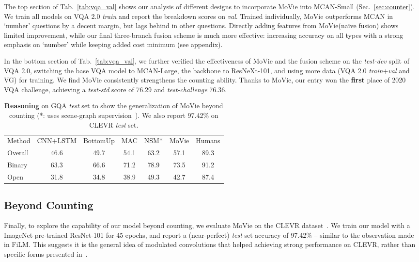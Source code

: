 \documentclass{article} \usepackage[dvipsnames,table]{xcolor}
\newcommand{\ours}[0]{MoVie\xspace}
\newcommand{\tablestyle}[2]{\setlength{\tabcolsep}{#1}\renewcommand{\arraystretch}{#2}\centering\footnotesize}
\begin{document}
The top section of Tab.~\ref{tab:vqa_val} shows our analysis of different designs to incorporate \ours into MCAN-Small (Sec.~\ref{sec:counter}). We train all models on VQA 2.0 {\em train} and report the breakdown scores on {\em val}. Trained individually, \ours outperforms MCAN in `number' questions by a decent margin, but lags behind in other questions. Directly adding features from \ours (na\"{i}ve fusion) shows limited improvement, while our final three-branch fusion scheme is much more effective: increasing accuracy on all types with a strong emphasis on `number' while keeping added cost minimum (see appendix).

In the bottom section of Tab.~\ref{tab:vqa_val}, we further verified the effectiveness of \ours and the fusion scheme on the {\em test-dev} split of VQA 2.0, switching the base VQA model to MCAN-Large, the backbone to ResNeXt-101, and using more data (VQA 2.0 {\em train}+{\em val} and VG) for training. We find \ours consistently strengthens the counting ability. Thanks to \ours, our entry won the \textbf{first} place of 2020 VQA challenge, achieving a \emph{test-std} score of 76.29 and \emph{test-challenge} 76.36. 

\begin{table}[t]
\tablestyle{3.5pt}{1.1}
\begin{tabular}{l|cccc|c|c}
Method & CNN+LSTM & BottomUp \citeyearpar{anderson2018bottom} & MAC \citeyearpar{hudson2018compositional} & NSM* \citeyearpar{hudson2019learning} & \ours & Humans \\
\shline
Overall  & 46.6 & 49.7 & 54.1 & 63.2 & 57.1 & 89.3 \\
Binary  & 63.3 & 66.6 & 71.2 & 78.9 & 73.5 & 91.2 \\
Open  & 31.8 & 34.8 & 38.9 & 49.3 & 42.7 & 87.4 \\
\end{tabular}
\smallskip
\caption{{\bf Reasoning} on GQA {\em test} set to show the generalization of \ours beyond counting (*: uses scene-graph supervision~\cite{krishna2017visual}). We also report 97.42\% on CLEVR \emph{test} set.} 
\label{tab:gqa}
\end{table}


\subsection{Beyond Counting\label{sec:exp:beyond}}

Finally, to explore the capability of our model beyond counting, we evaluate \ours on the CLEVR dataset~\cite{johnson2017clevr}. We train our model with a ImageNet pre-trained ResNet-101 for 45 epochs, and report a (near-perfect) \emph{test} set accuracy of 97.42\% -- similar to the observation made in FiLM. This suggests it is the general idea of modulated convolutions that helped achieving strong performance on CLEVR, rather than specific forms presented in~\cite{perez2018film}.
\end{document}
